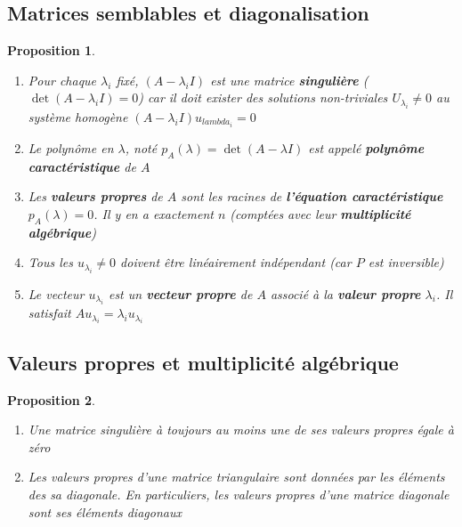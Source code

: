 \documentclass{article}[french, babel]
\newtheorem{myprop}{Proposition}
\begin{document}
	\subsection{Matrices semblables et diagonalisation}
		\begin{myprop}
			~
			\begin{enumerate}
				\item Pour chaque $\lambda_i$ fixé, $(A-\lambda_i I)$ est une matrice \textbf{singulière} ($\det(A-\lambda_i I)=0$) car il doit exister des solutions non-triviales $U_{\lambda_i}\neq 0$ au système homogène $(A-\lambda_i I)u_{lambda_i}=0$
				\item Le polynôme en $\lambda$, noté $p_A(\lambda)=\det(A-\lambda I)$ est appelé \textbf{polynôme caractéristique }de $A$
				\item Les \textbf{valeurs propres} de $A$ sont les racines de \textbf{l'équation caractéristique} $p_A (\lambda)=0$. Il y en a exactement $n$ (comptées avec leur \textbf{multiplicité algébrique})
				\item Tous les $u_{\lambda_i}\neq 0$ doivent être linéairement indépendant (car $P$ est inversible)
				\item Le vecteur $u_{\lambda_i}$ est un \textbf{vecteur propre} de $A$ associé à la \textbf{valeur propre} $\lambda_i$. Il satisfait $Au_{\lambda_i}=\lambda_i u_{\lambda_i}$
			\end{enumerate}
		\end{myprop}
	\subsection{Valeurs propres et multiplicité algébrique}
		\begin{myprop}
			~
			\begin{enumerate}
				\item Une matrice singulière à toujours au moins une de ses valeurs propres égale à zéro
				\item Les valeurs propres d'une matrice triangulaire sont données par les éléments des sa diagonale. En particuliers, les valeurs propres d'une matrice diagonale sont ses éléments diagonaux
			\end{enumerate}
		\end{myprop}
\end{document}

